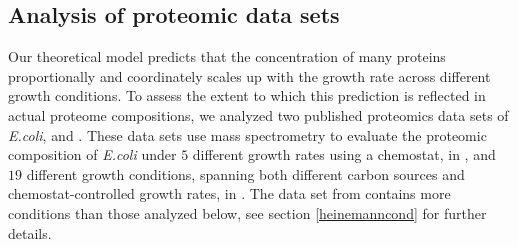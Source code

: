 \subsection{Analysis of proteomic data sets}
Our theoretical model predicts that the concentration of many proteins proportionally and coordinately scales up with the growth rate across different growth conditions.
To assess the extent to which this prediction is reflected in actual proteome compositions, we analyzed two published proteomics data sets of \emph{E.coli}, \cite{Valgepea2013} and \cite{Heinemann2015}.
These data sets use mass spectrometry to evaluate the proteomic composition of \emph{E.coli} under $5$ different growth rates using a chemostat, in \cite{Valgepea2013}, and $19$ different growth conditions, spanning both different carbon sources and chemostat-controlled growth rates, in \cite{Heinemann2015}.
The data set from \cite{Heinemann2015} contains more conditions than those analyzed below, see section \ref{heinemanncond} for further details.